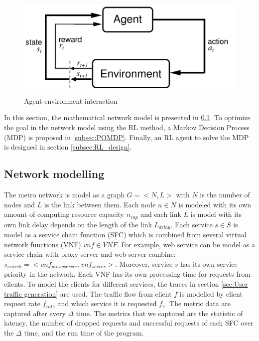 \documentclass[conference]{IEEEtran}
\begin{document}
\begin{figure}[]
    \centering
        \includegraphics[scale = 0.6]{imgs/DRL.png}
        \caption{Agent-environment interaction}
        \label{fig:RL_overview}
    \end{figure}

In this section, the mathematical network model is presented in \ref{subsec:network_model}. To optimize the goal in the network model using the RL method, a Markov Decision Process (MDP) is proposed in \ref{subsec:POMDP}. Finally, an RL agent to solve the MDP is designed in section \ref{subsec:RL_design}.

\subsection{Network modelling}
\label{subsec:network_model}
The metro network is model as a graph $G = <N, L> $ with $N$ is the number of nodes and $L$ is the link between them. Each node $n \in N$ is modeled with its own amount of computing resource capacity $n_{cap}$ and each link $L$ is model with its own link delay depends on the length of the link $L_{delay}$. Each service $s \in S$ is model as a service chain function (SFC) which is combined from several virtual network functions (VNF) $vnf \in VNF$. For example, web service can be model as a service chain with proxy server and web server combine: $s_{search} = <vnf_{proxy server}, vnf_{server}>$. Moreover, service $s$ has its own service priority in the network. Each VNF has its own processing time for requests from clients. To model the clients for different services, the traces in section \ref{sec:User traffic generation} are used. The traffic flow from client $f$ is modelled by client request rate $f_{rate}$ and which service it is requested $f_s$. The metric data are captured after every $\Delta$ time. The metrics that we captured are the statistic of latency, the number of dropped requests and successful requests of each SFC over the $\Delta$ time, and the run time of the program. 
\end{document}
